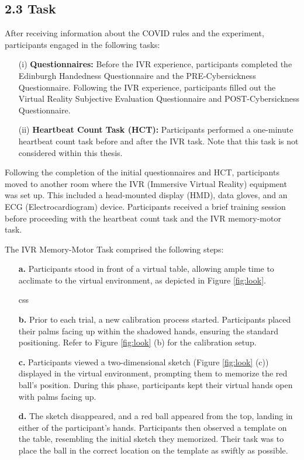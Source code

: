 \documentclass[12pt,oneside,openright]{report}
\begin{document}
\subsection*{2.3 Task}

After receiving information about the COVID rules and the experiment, participants engaged in the following tasks:

\begin{enumerate}
\item[(i)] \textbf{Questionnaires:} Before the IVR experience, participants completed the Edinburgh Handedness Questionnaire and the PRE-Cybersickness Questionnaire. Following the IVR experience, participants filled out the Virtual Reality Subjective Evaluation Questionnaire and POST-Cybersickness Questionnaire.

\item[(ii)] \textbf{Heartbeat Count Task (HCT):} Participants performed a one-minute heartbeat count task before and after the IVR task. Note that this task is not considered within this thesis.
\end{enumerate}

Following the completion of the initial questionnaires and HCT, participants moved to another room where the IVR (Immersive Virtual Reality) equipment was set up. This included a head-mounted display (HMD), data gloves, and an ECG (Electrocardiogram) device. Participants received a brief training session before proceeding with the heartbeat count task and the IVR memory-motor task.

The IVR Memory-Motor Task comprised the following steps:
\begin{enumerate}
    \item[\textbf{a.}] Participants stood in front of a virtual table, allowing ample time to acclimate to the virtual environment, as depicted in Figure \ref{fig:look}.
    
    css
    
    \item[\textbf{b.}] Prior to each trial, a new calibration process started. Participants placed their palms facing up within the shadowed hands, ensuring the standard positioning. Refer to Figure \ref{fig:look} (b) for the calibration setup.
    
    \item[\textbf{c.}] Participants viewed a two-dimensional sketch (Figure \ref{fig:look} (c)) displayed in the virtual environment, prompting them to memorize the red ball's position. During this phase, participants kept their virtual hands open with palms facing up.
    
    \item[\textbf{d.}] The sketch disappeared, and a red ball appeared from the top, landing in either of the participant's hands. Participants then observed a template on the table, resembling the initial sketch they memorized. Their task was to place the ball in the correct location on the template as swiftly as possible.
    
    \end{enumerate}
\end{document}
